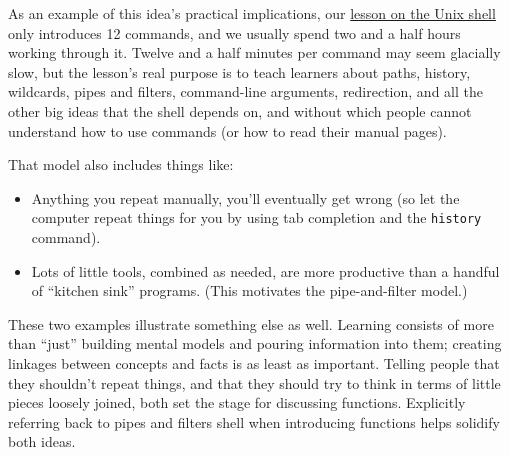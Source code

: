 As an example of this idea's practical implications, our
\href{http://swcarpentry.github.io/shell-novice/}{lesson on the Unix
shell} only introduces 12 commands, and we usually spend two and a half
hours working through it. Twelve and a half minutes per command may seem
glacially slow, but the lesson's real purpose is to teach learners about
paths, history, wildcards, pipes and filters, command-line arguments,
redirection, and all the other big ideas that the shell depends on, and
without which people cannot understand how to use commands (or how to
read their manual pages).

That model also includes things like:

\begin{itemize}
\itemsep1pt\parskip0pt
\item
  Anything you repeat manually, you'll eventually get wrong (so let the
  computer repeat things for you by using tab completion and the
  \texttt{history} command).
\item
  Lots of little tools, combined as needed, are more productive than a
  handful of ``kitchen sink'' programs. (This motivates the
  pipe-and-filter model.)
\end{itemize}

These two examples illustrate something else as well. Learning consists
of more than ``just'' building mental models and pouring information
into them; creating linkages between concepts and facts is as least as
important. Telling people that they shouldn't repeat things, and that
they should try to think in terms of little pieces loosely joined, both
set the stage for discussing functions. Explicitly referring back to
pipes and filters shell when introducing functions helps solidify both
ideas.

